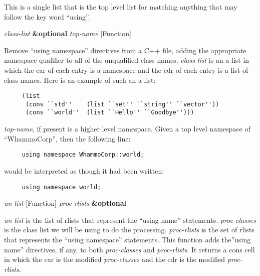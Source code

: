 \begin{doc-string}
This is a single list that is the top level list for matching anything
that may follow the key word ``using''.
\end{doc-string}

\vspace{1em}
\noindent
{}
\usebox{\funcname}\emph{class-list} \textbf{\&optional} \emph{top-name}
 \hfill [Function]

\begin{doc-string}
Remove ``using namespace'' directives from a C++ file, adding the appropriate
namespace qualifier to all of the unqualified class names.  \emph{class-list} is an
a-list in which the car of each entry is a namespace and the cdr of each entry
is a list of class names.  Here is an example of such an a-list:

\small{\begin{verbatim}
     (list
      (cons ``std''    (list ``set'' ``string'' ``vector''))
      (cons ``world''  (list ``Hello'' ``Goodbye'')))
\end{verbatim}}

\emph{top-name}, if present is a higher level namespace.  Given a top level namespace
of ``WhammoCorp'', then the following line:

\small{\begin{verbatim}
     using namespace WhammoCorp::world;
\end{verbatim}}

would be interpreted as though it had been written:

\small{\begin{verbatim}
     using namespace world;
\end{verbatim}}
\end{doc-string}

\vspace{1em}
\noindent
{}
\usebox{\funcname}\emph{un-list}
 \hfill [Function]
\hspace*{\wd\funcname}\emph{proc-rlists}
\hspace*{\wd\funcname}\textbf{\&optional}
\hspace*{\wd\funcname}

\begin{doc-string}
\emph{un-list} is the list of rlists that represent the ``using name'' statements.
\emph{proc-classes} is the class list we will be using to do the processing.
\emph{proc-rlists} is the set of rlists that represents the ``using namespace''
statements.  This function adds the''using name'' directives, if any, to both
\emph{proc-classes} and \emph{proc-rlists}.  It returns a cons cell in which the car is the
modified \emph{proc-classes} and the cdr is the modified \emph{proc-rlists}.
\end{doc-string}

